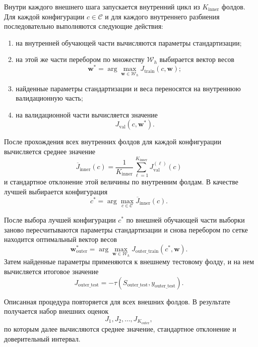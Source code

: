 Внутри каждого внешнего шага запускается внутренний цикл из $K_{\mathrm{inner}}$ фолдов. Для каждой конфигурации $c \in \mathcal{C}$ и для каждого внутреннего разбиения последовательно выполняются следующие действия:
\begin{enumerate}
    \item на внутренней обучающей части вычисляются параметры стандартизации;
    \item на этой же части перебором по множеству $\mathcal{W}_h$ выбирается вектор весов
    \[
    \mathbf{w}^{*}
    =
    \arg\max_{\mathbf{w}\in\mathcal{W}_h}
    J_{\mathrm{train}}(c,\mathbf{w});
    \]
    \item найденные параметры стандартизации и веса переносятся на внутреннюю валидационную часть;
    \item на валидационной части вычисляется значение
    \[
    J_{\mathrm{val}}(c,\mathbf{w}^{*}).
    \]
\end{enumerate}

После прохождения всех внутренних фолдов для каждой конфигурации вычисляется среднее значение
\[
\overline{J}_{\mathrm{inner}}(c)
=
\frac{1}{K_{\mathrm{inner}}}
\sum_{\ell=1}^{K_{\mathrm{inner}}}
J_{\mathrm{val}}^{(\ell)}(c)
\]
и стандартное отклонение этой величины по внутренним фолдам. В качестве лучшей выбирается конфигурация
\[
c^{*}
=
\arg\max_{c \in \mathcal{C}}
\overline{J}_{\mathrm{inner}}(c).
\]

После выбора лучшей конфигурации $c^{*}$ по внешней обучающей части выборки заново пересчитываются параметры стандартизации и снова перебором по сетке находится оптимальный вектор весов
\[
\mathbf{w}^{*}_{\mathrm{outer}}
=
\arg\max_{\mathbf{w}\in\mathcal{W}_h}
J_{\mathrm{outer\_train}}(c^{*},\mathbf{w}).
\]
Затем найденные параметры применяются к внешнему тестовому фолду, и на нем вычисляется итоговое значение
\[
J_{\mathrm{outer\_test}} = -\tau\!\left(S_{\mathrm{outer\_test}}, y_{\mathrm{outer\_test}}\right).
\]

Описанная процедура повторяется для всех внешних фолдов. В результате получается набор внешних оценок
\[
J_1, J_2, \dots, J_{K_{\mathrm{outer}}},
\]
по которым далее вычисляются среднее значение, стандартное отклонение и доверительный интервал.



